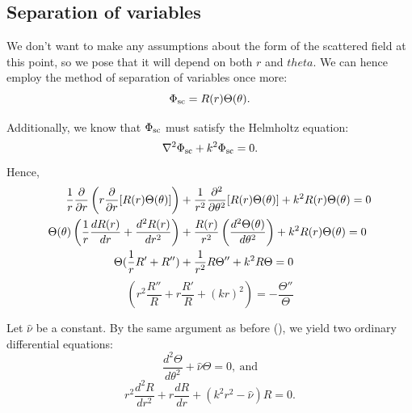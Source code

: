 \subsection{Separation of variables}\label{ss:ch2_sep_of_vars}
We don't want to make any assumptions about the form of the scattered field at this point, so we pose that it will depend on both $r$ and $theta$. We can hence employ the method of separation of variables once more:
    \begin{equation}
        \Phi_{\text{sc}} = R(r) \Theta(\theta).
    \end{equation}\par
%
Additionally, we know that $\Phi_{\text{sc}}$ must satisfy the Helmholtz equation:
    \begin{equation}\label{eq:phisc_helmholtz}
        \nabla^2 \Phi_{\text{sc}} + k^2 \Phi_{\text{sc}} = 0.
    \end{equation}
Hence,
    \begin{align*}
        \frac{1}{r} \frac{\partial }{\partial r} 
        \left( r \frac{\partial }{\partial r} [R(r) \Theta(\theta)] \right)
        &+ \frac{1}{r^2} \frac{\partial ^2}{\partial \theta^2} [R(r) \Theta(\theta)] 
        + k^2 R(r) \Theta(\theta) = 0 \\
        \Theta(\theta) \left( \frac{1}{r} \frac{dR(r)}{dr} + \frac{d^2 R(r)}{dr^2} \right)
        &+ \frac{R(r)}{r^2} \left( \frac{d^2 \Theta(\theta)}{d\theta^2}\right)
        + k^2 R(r) \Theta(\theta) = 0 \\
        \Theta ( \frac{1}{r} R' + R'') 
        &+ \frac{1}{r^2} R \Theta'' + k^2 R \Theta = 0
    \end{align*}
    \begin{equation}
         \left ( r^2 \frac{R''}{R} + r\frac{R'}{R} + (kr)^2 \right ) = - \frac{\Theta''}{\Theta}
    \end{equation}\par
%
Let $\hat{\nu}$ be a constant. By the same argument as before (), we yield two ordinary differential equations:
    \begin{equation}\label{eq:ch2_theta_dep}
        \frac{d^2 \Theta}{d\theta^2} + \hat{\nu} \Theta = 0, ~\text{and} 
    \end{equation}
    \begin{equation}\label{eq:ch2_r_dep}
        r^2 \frac{d^2 R}{dr^2} + r \frac{d R}{dr} + (k^2r^2 - \hat{\nu}) R = 0.
    \end{equation}
%
